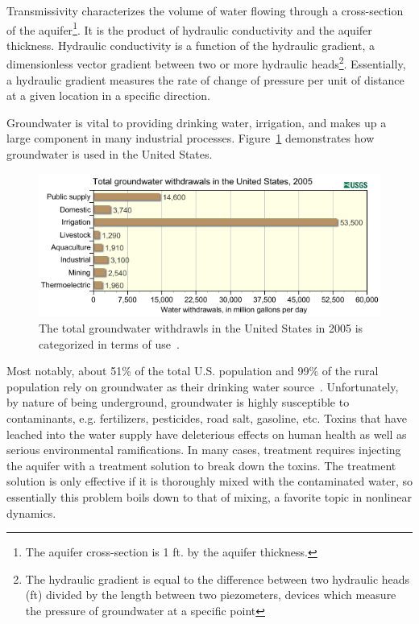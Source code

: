 \noindent Transmissivity characterizes the volume of water flowing through a
 cross-section of the aquifer\footnote{The aquifer cross-section is 1
   ft. by the aquifer thickness.}. It is the product of hydraulic
 conductivity and the aquifer thickness. Hydraulic conductivity is a
 function of the hydraulic gradient, a dimensionless vector gradient between two or more hydraulic heads\footnote{The hydraulic gradient is equal to the difference between two hydraulic heads (ft) divided by
 the length between two piezometers, devices which measure the
 pressure of groundwater at a specific point}. Essentially, a
hydraulic gradient measures the rate of change of pressure per unit of
distance at a given location in a specific direction.

Groundwater is vital
to providing drinking water, irrigation, and makes up a large
component in many industrial processes. Figure~\ref{fig:gwuse}
demonstrates how groundwater is used in the United States. 
\begin{figure}[!h]
\caption[Groundwater usage in the United States in 2005]{The total
  groundwater withdrawls in the United States in 2005 is categorized
  in terms of use~\cite{usgsgw}.}\label{fig:gwuse}
    \begin{center}
	\includegraphics[scale=0.8]{figs/gwuse.png}
    \end{center}
\end{figure}
Most
notably, about 51\% of the total U.S. population and 99\% of the
rural population rely on groundwater as their drinking water
source~\cite{gw}. Unfortunately, by nature of being underground,
groundwater is highly susceptible to contaminants, e.g. fertilizers,
pesticides, road salt, gasoline, etc. Toxins that have leached into
the water supply have deleterious effects on human health as well as
serious environmental ramifications. In many cases, treatment requires injecting the aquifer with a treatment solution to break down the toxins. The treatment solution is only effective if it is thoroughly mixed with the contaminated water, so essentially this problem boils down to that of mixing, a favorite topic in nonlinear dynamics. 

